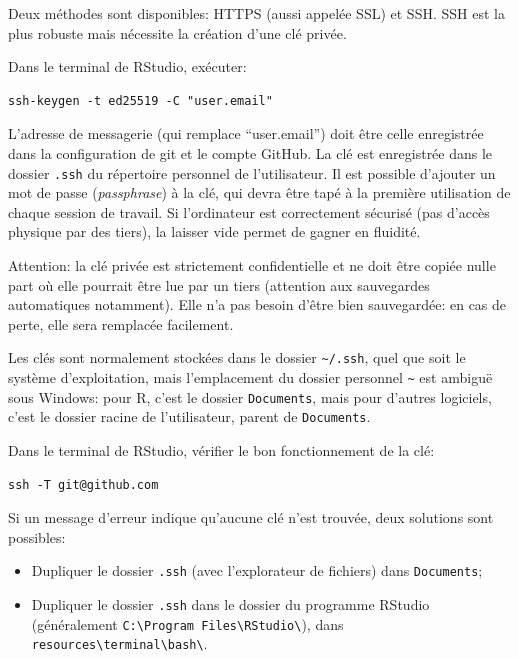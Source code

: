 \documentclass[
  12pt,
  french,
  a4paper,
  extrafontsizes,onecolumn,openright
  ]{memoir}
\providecommand{\tightlist}{%
  \setlength{\itemsep}{0pt}\setlength{\parskip}{0pt}}
\begin{document}
Deux méthodes sont disponibles: HTTPS (aussi appelée SSL) et SSH.
SSH est la plus robuste mais nécessite la création d'une clé privée.

Dans le terminal de RStudio, exécuter:

\begin{verbatim}
ssh-keygen -t ed25519 -C "user.email"
\end{verbatim}

L'adresse de messagerie (qui remplace \enquote{user.email}) doit être celle enregistrée dans la configuration de git et le compte GitHub.
La clé est enregistrée dans le dossier \texttt{.ssh} du répertoire personnel de l'utilisateur.
Il est possible d'ajouter un mot de passe (\emph{passphrase}) à la clé, qui devra être tapé à la première utilisation de chaque session de travail.
Si l'ordinateur est correctement sécurisé (pas d'accès physique par des tiers), la laisser vide permet de gagner en fluidité.

Attention: la clé privée est strictement confidentielle et ne doit être copiée nulle part où elle pourrait être lue par un tiers (attention aux sauvegardes automatiques notamment).
Elle n'a pas besoin d'être bien sauvegardée: en cas de perte, elle sera remplacée facilement.

Les clés sont normalement stockées dans le dossier \texttt{\textasciitilde{}/.ssh}, quel que soit le système d'exploitation, mais l'emplacement du dossier personnel \texttt{\textasciitilde{}} est ambiguë sous Windows: pour R, c'est le dossier \texttt{Documents}, mais pour d'autres logiciels, c'est le dossier racine de l'utilisateur, parent de \texttt{Documents}.

Dans le terminal de RStudio, vérifier le bon fonctionnement de la clé:

\begin{verbatim}
ssh -T git@github.com
\end{verbatim}

Si un message d'erreur indique qu'aucune clé n'est trouvée, deux solutions sont possibles:

\begin{itemize}
\tightlist
\item
  Dupliquer le dossier \texttt{.ssh} (avec l'explorateur de fichiers) dans \texttt{Documents};
\item
  Dupliquer le dossier \texttt{.ssh} dans le dossier du programme RStudio (généralement \texttt{C:\textbackslash{}Program\ Files\textbackslash{}RStudio\textbackslash{}}), dans \texttt{resources\textbackslash{}terminal\textbackslash{}bash\textbackslash{}}.
\end{itemize}
\end{document}
